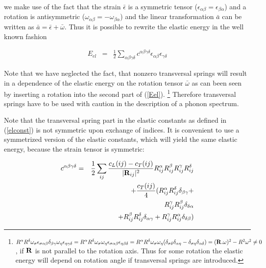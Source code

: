 we make use of the fact that the strain $\bar \epsilon$ is a symmetric 
tensor ($\epsilon_{\alpha\beta}=\epsilon_{\beta\alpha}$) and a rotation
is antisymmetric ($\omega_{\alpha\beta}=-\omega_{\beta\alpha}$) and 
the linear transformation $\bar a$ can be written as $\bar a=\bar \epsilon + \bar \omega$. Thus
it is possible to rewrite the elastic energy in the well known fashion

\begin{eqnarray}\label{Eelconst}
E_{el} &=& \frac{1}{2}\sum_{\alpha\beta\gamma\delta} c^{\alpha\beta\gamma\delta} \epsilon_{\alpha\beta}\epsilon_{\gamma\delta}
\end{eqnarray}



Note that we have neglected the fact, that nonzero transversal springs will 
result in a dependence of the elastic energy on the rotation tensor $\bar \omega$ as
can been seen by inserting a rotation into the second part of (\ref{Eel}).
\footnote{$R^{\alpha}R^{\delta}\omega_{\sigma}
\epsilon_{\sigma\alpha\beta}\delta_{\beta\gamma}\omega_{\eta}\epsilon_{\eta\gamma\delta}=
R^{\alpha}R^{\delta}\omega_{\sigma} \omega_{\eta}
\epsilon_{\sigma\alpha\beta}\epsilon_{\eta\beta\delta}=
R^{\alpha}R^{\delta}\omega_{\sigma} \omega_{\eta}
(\delta_{\sigma\delta}\delta_{\alpha\eta}-\delta_{\sigma\eta}\delta_{\alpha\delta})=
(\mathbf R . \mathbf \omega)^2-R^2\omega^2 \neq 0$,
if $\mathbf R$ is not parallel to the rotation axis. Thus for some rotation the elastic energy
will depend on rotation angle if transversal springs are  introduced.
}
Therefore transversal springs have to be used with caution
 in the description of a phonon spectrum.

Note that the transversal spring part in the elastic constants as defined in (\ref{elconst}) 
is not symmetric upon exchange of indices. It is convenient to use a symmetrized version
of the elastic constants, which will yield the same elastic energy, because the
strain tensor is symmetric:

{\color{blue}
\begin{eqnarray}\label{elconstsymm}
c^{\alpha\beta\gamma\delta} &= &
 \frac{1}{2}\sum_{ij}\frac{c_L(ij)-c_T(ij)}{|\mathbf R_{ij}|^2} 
R_{ij}^{\alpha}R_{ij}^{\beta}R_{ij}^{\gamma}R_{ij}^{\delta}
 \nonumber \\
&& +    \frac{c_T(ij)}{4} ( R_{ij}^{\alpha}R_{ij}^{\delta}
 \delta_{\beta\gamma}  + \nonumber \\
&&  R_{ij}^{\gamma} R_{ij}^{\beta}
 \delta_{\delta\alpha}  \nonumber \\
&& +    R_{ij}^{\beta}R_{ij}^{\delta}
 \delta_{\alpha\gamma}  +   R_{ij}^{\gamma}R_{ij}^{\alpha}
 \delta_{\delta\beta} ) \nonumber \\
\end{eqnarray}
}


